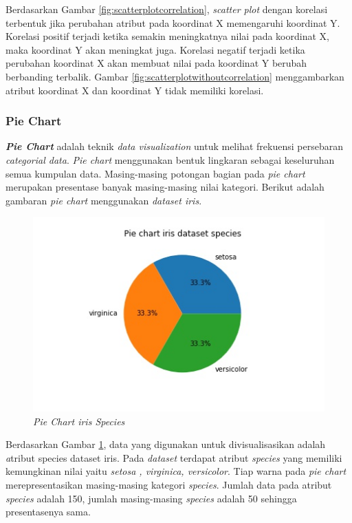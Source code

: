 \documentclass[a4paper,twoside]{article}
\begin{document}
\begin{enumerate}
Berdasarkan Gambar \ref{fig:scatterplotcorrelation}, \textit{scatter plot} dengan korelasi terbentuk jika perubahan atribut pada koordinat X memengaruhi koordinat Y. Korelasi positif terjadi ketika semakin meningkatnya nilai pada koordinat X, maka koordinat Y akan meningkat juga. Korelasi negatif terjadi ketika perubahan koordinat X akan membuat nilai pada koordinat Y berubah berbanding terbalik. Gambar \ref{fig:scatterplotwithoutcorrelation} menggambarkan atribut koordinat X dan koordinat Y tidak memiliki korelasi.  
\subsubsection{\textbf{Pie Chart}}
\textbf{\textit{Pie Chart}} adalah teknik \textit{data visualization} untuk melihat frekuensi persebaran \textit{categorial data}. \textit{Pie chart} menggunakan bentuk lingkaran sebagai keseluruhan semua kumpulan data. Masing-masing potongan bagian pada \textit{pie chart} merupakan presentase banyak masing-masing nilai kategori. Berikut adalah gambaran \textit{pie chart} menggunakan \textit{dataset iris}. 
\pagebreak	
	\begin{figure}[h!]
		\centering  
		\includegraphics[scale=0.7]{piechart}   
		\caption{\textit{Pie Chart iris Species }}
		\label{fig:piechart} 
	\end{figure}
	
Berdasarkan Gambar \ref{fig:piechart}, data yang digunakan untuk divisualisasikan adalah \textit atribut {species dataset iris}. Pada \textit{dataset} terdapat atribut \textit{species} yang memiliki kemungkinan nilai yaitu \textit{setosa , virginica, versicolor}. Tiap warna pada \textit{pie chart} merepresentasikan masing-masing kategori \textit{species}. Jumlah data pada atribut \textit{species} adalah 150, jumlah masing-masing \textit{species} adalah 50 sehingga presentasenya sama.


\end{enumerate}
\end{document}
